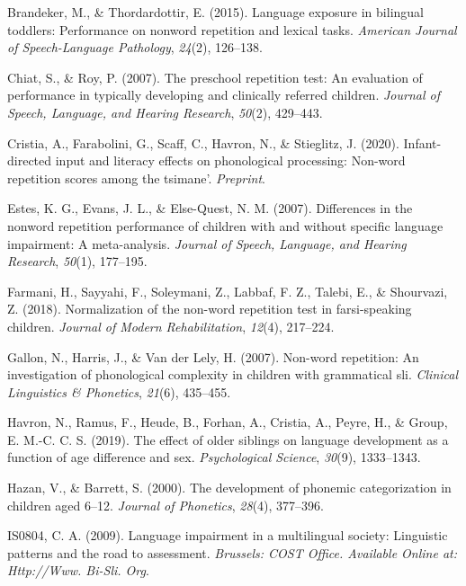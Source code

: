\documentclass[english,,man]{apa6}
\begin{document}
\leavevmode\hypertarget{ref-brandeker2015language}{}%
Brandeker, M., \& Thordardottir, E. (2015). Language exposure in bilingual toddlers: Performance on nonword repetition and lexical tasks. \emph{American Journal of Speech-Language Pathology}, \emph{24}(2), 126--138.

\leavevmode\hypertarget{ref-chiat2007preschool}{}%
Chiat, S., \& Roy, P. (2007). The preschool repetition test: An evaluation of performance in typically developing and clinically referred children. \emph{Journal of Speech, Language, and Hearing Research}, \emph{50}(2), 429--443.

\leavevmode\hypertarget{ref-cristia2020infant}{}%
Cristia, A., Farabolini, G., Scaff, C., Havron, N., \& Stieglitz, J. (2020). Infant-directed input and literacy effects on phonological processing: Non-word repetition scores among the tsimane'. \emph{Preprint}.

\leavevmode\hypertarget{ref-estes2007differences}{}%
Estes, K. G., Evans, J. L., \& Else-Quest, N. M. (2007). Differences in the nonword repetition performance of children with and without specific language impairment: A meta-analysis. \emph{Journal of Speech, Language, and Hearing Research}, \emph{50}(1), 177--195.

\leavevmode\hypertarget{ref-farmani2018normalization}{}%
Farmani, H., Sayyahi, F., Soleymani, Z., Labbaf, F. Z., Talebi, E., \& Shourvazi, Z. (2018). Normalization of the non-word repetition test in farsi-speaking children. \emph{Journal of Modern Rehabilitation}, \emph{12}(4), 217--224.

\leavevmode\hypertarget{ref-gallon2007non}{}%
Gallon, N., Harris, J., \& Van der Lely, H. (2007). Non-word repetition: An investigation of phonological complexity in children with grammatical sli. \emph{Clinical Linguistics \& Phonetics}, \emph{21}(6), 435--455.

\leavevmode\hypertarget{ref-havron2019effect}{}%
Havron, N., Ramus, F., Heude, B., Forhan, A., Cristia, A., Peyre, H., \& Group, E. M.-C. C. S. (2019). The effect of older siblings on language development as a function of age difference and sex. \emph{Psychological Science}, \emph{30}(9), 1333--1343.

\leavevmode\hypertarget{ref-hazan2000development}{}%
Hazan, V., \& Barrett, S. (2000). The development of phonemic categorization in children aged 6--12. \emph{Journal of Phonetics}, \emph{28}(4), 377--396.

\leavevmode\hypertarget{ref-is08042009language}{}%
IS0804, C. A. (2009). Language impairment in a multilingual society: Linguistic patterns and the road to assessment. \emph{Brussels: COST Office. Available Online at: Http://Www. Bi-Sli. Org}.
\end{document}
